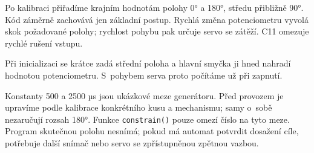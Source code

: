 Po kalibraci přiřadíme krajním hodnotám polohy 0° a 180°, středu přibližně 90°. Kód záměrně zachovává jen základní postup. Rychlá změna potenciometru vyvolá skok požadované polohy; rychlost pohybu pak určuje servo se zátěží. C11 omezuje rychlé rušení vstupu.

\noindent\begin{minipage}{\textwidth}

\end{minipage}

Při inicializaci se krátce zadá střední poloha a hlavní smyčka ji hned nahradí hodnotou potenciometru. S~pohybem serva proto počítáme už při zapnutí.

Konstanty 500 a 2500 µs jsou ukázkové meze generátoru. Před provozem je upravíme podle kalibrace konkrétního kusu a mechanismu; samy o~sobě nezaručují rozsah 180°. Funkce \texttt{constrain()} pouze omezí číslo na tyto meze. Program skutečnou polohu nesnímá; pokud má automat potvrdit dosažení cíle, potřebuje další snímač nebo servo se zpřístupněnou zpětnou vazbou.
